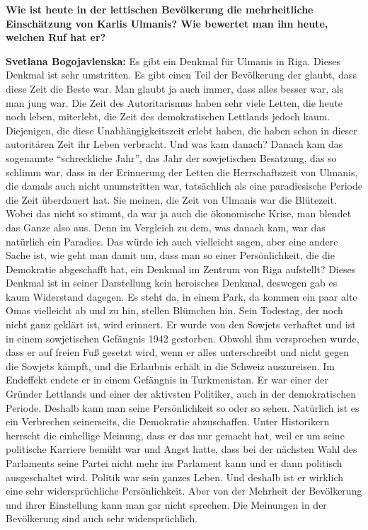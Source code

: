 \textbf{Wie ist heute in der lettischen Bevölkerung die mehrheitliche Einschätzung von Karlis Ulmanis? Wie bewertet man ihn heute, welchen Ruf hat er?}

\textbf{Svetlana Bogojavlenska:} Es gibt ein Denkmal für Ulmanis in Riga. Dieses Denkmal ist sehr umstritten. Es gibt einen Teil der Bevölkerung der glaubt, dass diese Zeit die Beste war. Man glaubt ja auch immer, dass alles besser war, als man jung war. Die Zeit des Autoritarismus haben sehr viele Letten, die heute noch leben, miterlebt, die Zeit des demokratischen Lettlands jedoch kaum. Diejenigen, die diese Unabhängigkeitszeit erlebt haben, die haben schon in dieser autoritären Zeit ihr Leben verbracht. Und was kam danach? Danach kam das sogenannte "`schreckliche Jahr"', das Jahr der sowjetischen Besatzung, das so schlimm war, dass in der Erinnerung der Letten die Herrschaftszeit von Ulmanis, die damals auch nicht unumstritten war, tatsächlich als eine paradiesische Periode die Zeit überdauert hat. Sie meinen, die Zeit von Ulmanis war die Blütezeit. Wobei das nicht so stimmt, da war ja auch die ökonomische Krise, man blendet das Ganze also aus. Denn im Vergleich zu dem, was danach kam, war das natürlich ein Paradies. Das würde ich auch vielleicht sagen, aber eine andere Sache ist, wie geht man damit um, dass man so einer Persönlichkeit, die die Demokratie abgeschafft hat, ein Denkmal im Zentrum von Riga aufstellt? Dieses Denkmal ist in seiner Darstellung kein heroisches Denkmal, deswegen gab es kaum Widerstand dagegen. Es steht da, in einem Park, da kommen ein paar alte Omas vielleicht ab und zu hin, stellen Blümchen hin. Sein Todestag, der noch nicht ganz geklärt ist, wird erinnert. Er wurde von den Sowjets verhaftet und ist in einem sowjetischen Gefängnis 1942 gestorben. Obwohl ihm versprochen wurde, dass er auf freien Fuß gesetzt wird, wenn er alles unterschreibt und nicht gegen die Sowjets kämpft, und die Erlaubnis erhält in die Schweiz auszureisen. Im Endeffekt endete er in einem Gefängnis in Turkmenistan. Er war einer der Gründer Lettlands und einer der aktivsten Politiker, auch in der demokratischen Periode. Deshalb kann man seine Persönlichkeit so oder so sehen. Natürlich ist es ein Verbrechen seinerseits, die Demokratie abzuschaffen. Unter Historikern herrscht die einhellige Meinung, dass er das nur gemacht hat, weil er um seine politische Karriere bemüht war und Angst hatte, dass bei der nächsten Wahl des Parlaments seine Partei nicht mehr ins Parlament kann und er dann politisch ausgeschaltet wird. Politik war sein ganzes Leben. Und deshalb ist er wirklich eine sehr widersprüchliche Persönlichkeit. Aber von der Mehrheit der Bevölkerung und ihrer Einstellung kann man gar nicht sprechen. Die Meinungen in der Bevölkerung sind auch sehr widersprüchlich.

